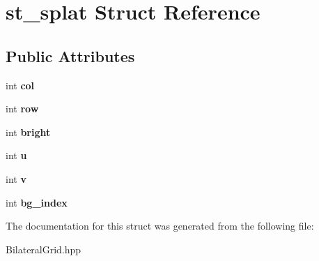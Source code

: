 \hypertarget{structst__splat}{}\section{st\+\_\+splat Struct Reference}
\label{structst__splat}
\subsection*{Public Attributes}
\begin{DoxyCompactItemize}
\item 
int {\bfseries col}\hypertarget{structst__splat_a2a2fd1e1ca903b331c1908f8fb9916b2}{}\label{structst__splat_a2a2fd1e1ca903b331c1908f8fb9916b2}

\item 
int {\bfseries row}\hypertarget{structst__splat_a1c2da92eb68b435d81690764320c27f9}{}\label{structst__splat_a1c2da92eb68b435d81690764320c27f9}

\item 
int {\bfseries bright}\hypertarget{structst__splat_ad02cb583911873708614b3883a485015}{}\label{structst__splat_ad02cb583911873708614b3883a485015}

\item 
int {\bfseries u}\hypertarget{structst__splat_a9a6f0d8bec300845a2db0f13e574d55b}{}\label{structst__splat_a9a6f0d8bec300845a2db0f13e574d55b}

\item 
int {\bfseries v}\hypertarget{structst__splat_aba0eadf7a1525817bf91f407e29ac268}{}\label{structst__splat_aba0eadf7a1525817bf91f407e29ac268}

\item 
int {\bfseries bg\+\_\+index}\hypertarget{structst__splat_a1ae0a6f4b5b18192874718a87eb6a02d}{}\label{structst__splat_a1ae0a6f4b5b18192874718a87eb6a02d}

\end{DoxyCompactItemize}


The documentation for this struct was generated from the following file\+:\begin{DoxyCompactItemize}
\item 
Bilateral\+Grid.\+hpp\end{DoxyCompactItemize}
